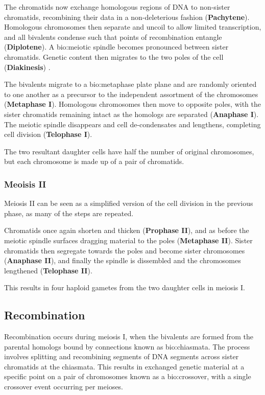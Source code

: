 The chromatids now exchange homologous regions of DNA to non-sister chromatids, recombining their data in a non-deleterious fashion (\textbf{Pachytene}).  Homologous chromosomes then separate and uncoil to allow limited transcription, and all bivalents condense such that points of recombination entangle (\textbf{Diplotene}). A \gls{bio:meiotic spindle} becomes pronounced between sister chromatids. Genetic content then migrates to the two poles of the cell (\textbf{Diakinesis}) .

The bivalents migrate to a \gls{bio:metaphase plate} plane and are randomly oriented to one another as a precursor to the independent assortment of the chromosomes (\textbf{Metaphase I}). Homologous chromosomes then move to opposite poles, with the sister chromatids remaining intact as the homologs are separated (\textbf{Anaphase I}).  The meiotic spindle disappears and cell de-condensates and lengthens, completing cell division (\textbf{Telophase I}). 

The two resultant daughter cells have half the number of original chromosomes, but each chromosome is made up of a pair of chromatids.


\subsubsection{Meoisis II}

Meiosis II can be seen as a simplified version of the cell division in the previous phase, as many of the steps are repeated.

Chromatids once again shorten and thicken (\textbf{Prophase II}), and as before the meiotic spindle surfaces dragging material to the poles (\textbf{Metaphase II}). Sister chromatids then segregate towards the poles and become sister chromosomes (\textbf{Anaphase II}), and finally the spindle is dissembled and the chromosomes lengthened (\textbf{Telophase II}).

This results in four haploid gametes from the two daughter cells in meiosis I. 

\subsection{Recombination}


Recombination occurs during meiosis I, when the bivalents are formed from the parental homologs bound by connections known as \gls{bio:chiasmata}.  The process involves splitting and recombining segments of DNA segments across sister chromatids at the chiasmata. This results in exchanged genetic material at a specific point on a pair of chromosomes known as a \gls{bio:crossover}, with a single crossover event occurring per meioses.

